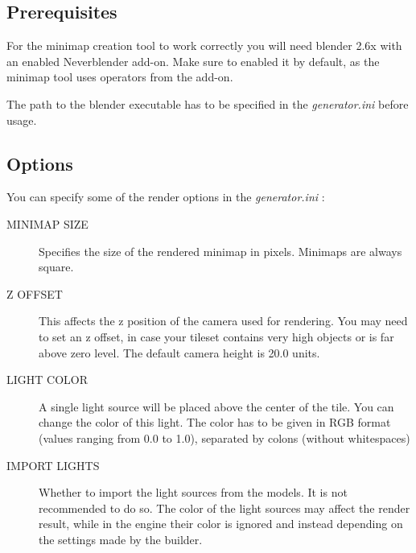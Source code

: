 \documentclass[a4paper]{article}
\begin{document}
\subsection{Prerequisites}
For the minimap creation tool to work correctly you will need blender 2.6x with an enabled Neverblender add-on. Make sure to enabled it by default, as the minimap tool uses operators from the add-on.

The path to the blender executable has to be specified in the {\itshape{generator.ini}} before usage.

\subsection{Options}
You can specify some of the render options in the {\itshape{generator.ini}} :
\begin{description}
\item[MINIMAP SIZE] Specifies the size of the rendered minimap in pixels. Minimaps are always square.
\item[Z OFFSET] This affects the z position of the camera used for rendering. You may need to set an z offset, in case your tileset contains very high objects or is far above zero level. The default camera height is 20.0 units.
\item[LIGHT COLOR] A single light source will be placed above the center of the tile. 
You can change the color of this light. The color has to be given in RGB format (values ranging from 0.0 to 1.0), separated by colons (without whitespaces)
\item[IMPORT LIGHTS] Whether to import the light sources from the models. It is not recommended
to do so. The color of the light sources may affect the render result, while in the engine their color is ignored and instead depending on the settings made by the builder.
\end{description}
\end{document}
